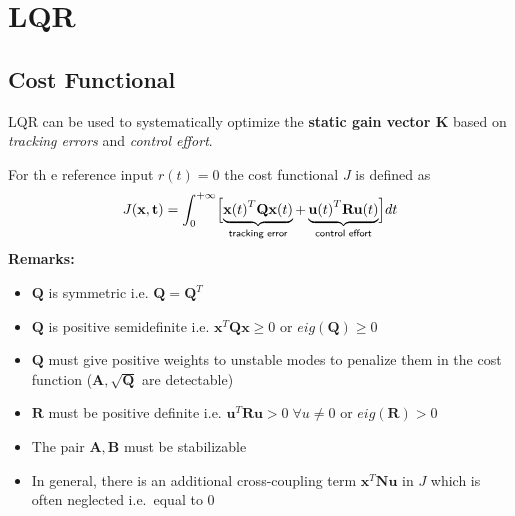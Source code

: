 \section{LQR}
\subsection{Cost Functional}
LQR can be used to systematically optimize the \textbf{static gain vector K} based on \textit{tracking errors} and \textit{control effort}.

For th   e reference input $r(t) = 0$ the cost functional $J$ is defined as
\noindent\begin{equation*}
    J(\mathbf{x,t})=\int_0^{+\infty} \Bigl[\underbrace{{\mathbf{x}(t)}^T\mathbf{Qx}(t)}_{\textsf{tracking error}} + \underbrace{{\mathbf{u}(t)}^T \mathbf{Ru}(t)}_{\textsf{control effort}} \Bigr]dt
\end{equation*}
\textbf{Remarks:}
\begin{itemize}
    \item $\mathbf{Q}$ is symmetric i.e. $\mathbf{Q}=\mathbf{Q}^T$
    \item $\mathbf{Q}$ is positive semidefinite i.e. $\mathbf{x}^T \mathbf{Qx} \geq 0$ or $eig(\mathbf{Q}) \geq 0$
    \item $\mathbf{Q}$ must give positive weights to unstable modes to penalize them in the cost function ($\mathbf{A}, \sqrt{\mathbf{Q}}$ are detectable)
    \item $\mathbf{R}$ must be positive definite i.e. $\mathbf{u}^T \mathbf{Ru} >0\; \forall u\neq 0$ or $eig(\mathbf{R}) > 0$
    \item The pair $\mathbf{A,B}$ must be stabilizable
    \item In general, there is an additional cross-coupling term $\mathbf{x}^T\mathbf{Nu}$ in $J$ which is often neglected i.e.\ equal to $0$
\end{itemize}


